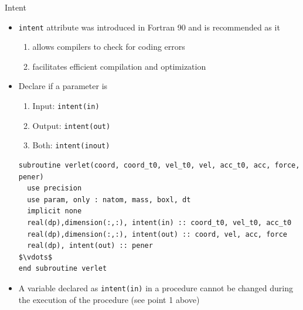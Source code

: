 \documentclass[c,mathserif,compress,xcolor=svgnames]{beamer}
\newcommand*\vardiamond{\textcolor{tigerspurple}{%
  \ensuremath{\blacklozenge}}}
\newcommand{\lstfortran}[1]{\lstinline[language={[90]Fortran},basicstyle=\footnotesize\ttfamily]|#1|}
\begin{document}
\begin{frame}[fragile]{Intent}
  \begin{itemize}
    \item \lstfortran{intent} attribute was introduced in Fortran 90 and is recommended as it
    \begin{enumerate}
      \item allows compilers to check for coding errors
      \item facilitates efficient compilation and optimization
    \end{enumerate}
    \item Declare if a parameter is
    \begin{enumerate}
      \item[$\vardiamond$]Input: \lstfortran{intent(in)} 
      \item[$\vardiamond$]Output: \lstfortran{intent(out)}
      \item[$\vardiamond$]Both: \lstfortran{intent(inout)}
    \end{enumerate}
    \begin{lstlisting}[language={[90]Fortran},mathescape,basicstyle=\fontsize{6}{7}\selectfont\ttfamily]
subroutine verlet(coord, coord_t0, vel_t0, vel, acc_t0, acc, force, pener)
  use precision
  use param, only : natom, mass, boxl, dt
  implicit none
  real(dp),dimension(:,:), intent(in) :: coord_t0, vel_t0, acc_t0
  real(dp),dimension(:,:), intent(out) :: coord, vel, acc, force
  real(dp), intent(out) :: pener
$\vdots$
end subroutine verlet
    \end{lstlisting}
    \item A variable declared as \lstfortran{intent(in)} in a procedure cannot be changed during the execution of the procedure (see point 1 above)
  \end{itemize}
\end{frame}
\end{document}
